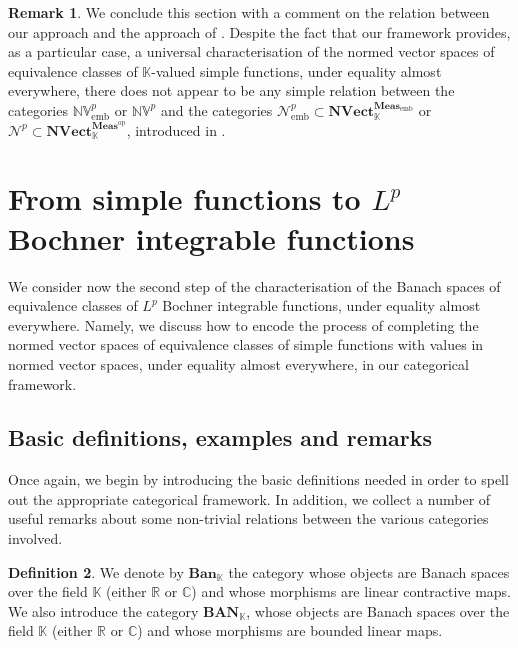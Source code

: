 \documentclass{amsart}
\theoremstyle{definition}
\newtheorem{definition}{Definition}[section]
\newtheorem{remark}[definition]{Remark}
\theoremstyle{plain}
\newcommand{\K}{\mathbb{K}}
\newcommand{\R}{\mathbb{R}}
\newcommand{\C}{\mathbb{C}}
\newcommand{\opMeas}{\mathbf{Meas}^\mathrm{op}}
\newcommand{\embMeas}{\mathbf{Meas}_\mathrm{emb}}
\newcommand{\NVect}{\mathbf{NVect}_{\mathbb{K}}}
\newcommand{\NVembp}{\mathbb{NV}_{\mathrm{emb}}^p}
\newcommand{\NVp}{\mathbb{NV}^p}
\newcommand{\Ban}{\mathbf{Ban}_{\mathbb{K}}}
\newcommand{\BAN}{\mathbf{BAN}_{\mathbb{K}}}
\begin{document}
        \begin{remark}
        \label{rem:connection to Leinster}
            We conclude this section with a comment on the relation between our approach and the approach of \cite{Leinster2023}.
            Despite the fact that our framework provides, as a particular case, a universal characterisation of the normed vector spaces of equivalence classes of $\K$-valued simple functions, under equality almost everywhere, there does not appear to be any simple relation between the categories $\NVembp$ or $\NVp$ and the categories $\mathcal{N}_{\mathrm{emb}}^p \subset \NVect^{\embMeas}$ or $\mathcal{N}^p \subset \NVect^{\opMeas}$, introduced in \cite[\S3]{Leinster2023}.  
        \end{remark}


\section{From simple functions to \texorpdfstring{$L^p$}{Lp} Bochner integrable functions}
\label{sec:completion}

    We consider now the second step of the characterisation of the Banach spaces of equivalence classes of $L^p$ Bochner integrable functions, under equality almost everywhere.
    Namely, we discuss how to encode the process of completing the normed vector spaces of equivalence classes of simple functions with values in normed vector spaces, under equality almost everywhere, in our categorical framework.
    
    \subsection{Basic definitions, examples and remarks}
    \label{sec:basic definitions examples and remarks 2}

        Once again, we begin by introducing the basic definitions needed in order to spell out the appropriate categorical framework.
        In addition, we collect a number of useful remarks about some non-trivial relations between the various categories involved.
        
        \begin{definition}
            We denote by $\Ban$ the category whose objects are Banach spaces over the field $\K$ (either $\R$ or $\C$) and whose morphisms are linear contractive maps.
            We also introduce the category $\BAN$, whose objects are Banach spaces over the field $\K$ (either $\R$ or $\C$) and whose morphisms are bounded linear maps.
        \end{definition}
\end{document}

